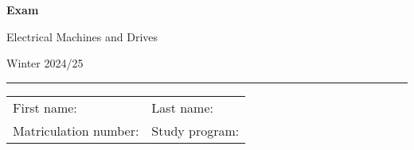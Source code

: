 \begin{center}

    {\vspace{3mm}\Large \textbf{
    \textsf{Exam}}
    \vspace{3mm}
    
    \LARGE
    \textsf{Electrical Machines and Drives}
    
    \vspace{6mm}
    \large
    
    Winter 2024/25
    \vspace{5mm}
    }
    
    
\end{center}
    
    \hrule
    
    
    \vspace{5mm}
    
\begin{flushleft}
\begin{tabular}{ll}
    First name:  \qquad \qquad \qquad  \qquad \qquad\qquad \qquad \qquad & Last name: \\[1cm]
     Matriculation number: & Study program:
\end{tabular}
\end{flushleft}


